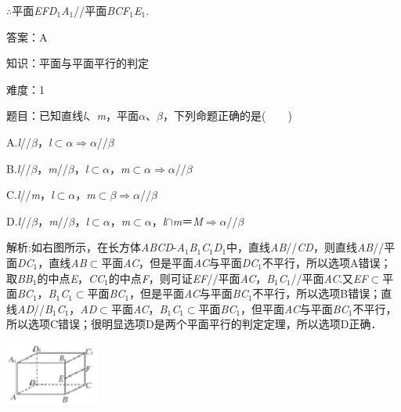 \documentclass{article} %
\begin{document}
$\mathrm{\therefore}$平面\textit{EFD}${}_{1}$\textit{A}${}_{1}$//平面\textit{BCF}${}_{1}$\textit{E}${}_{1}$.

答案：A

知识：平面与平面平行的判定

难度：1

题目：已知直线\textit{l}、\textit{m}，平面\textit{$\alpha$}、\textit{$\beta$}，下列命题正确的是(　　)

A.\textit{l}//\textit{$\beta$}，\textit{l}$\mathrm{\subset }$\textit{$\alpha$}$\mathrm{\Rightarrow }$\textit{$\alpha$}//\textit{$\beta$}

B.\textit{l}//\textit{$\beta$}，\textit{m}//\textit{$\beta$}，\textit{l}$\mathrm{\subset }$\textit{$\alpha$}，\textit{m}$\mathrm{\subset }$\textit{$\alpha$}$\mathrm{\Rightarrow }$\textit{$\alpha$}//\textit{$\beta$}

C.\textit{l}//\textit{m}，\textit{l}$\mathrm{\subset }$\textit{$\alpha$}，\textit{m}$\mathrm{\subset }$\textit{$\beta$}$\mathrm{\Rightarrow }$\textit{$\alpha$}//\textit{$\beta$}

D.\textit{l}//\textit{$\beta$}，\textit{m}//\textit{$\beta$}，\textit{l}$\mathrm{\subset }$\textit{$\alpha$}，\textit{m}$\mathrm{\subset }$\textit{$\alpha$}，\textit{l}$\mathrm{\cap}$\textit{m}＝\textit{M}$\mathrm{\Rightarrow }$\textit{$\alpha$}//\textit{$\beta$}

解析:如右图所示，在长方体\textit{ABCD}-\textit{A}${}_{1}$\textit{B}${}_{1}$\textit{C}${}_{1}$\textit{D}${}_{1}$中，直线\textit{AB}//\textit{CD}，则直线\textit{AB}//平面\textit{DC}${}_{1}$，直线\textit{AB}$\mathrm{\subset }$平面\textit{AC}，但是平面\textit{AC}与平面\textit{DC}${}_{1}$不平行，所以选项A错误；取\textit{BB}${}_{1}$的中点\textit{E}，\textit{CC}${}_{1}$的中点\textit{F}，则可证\textit{EF}//平面\textit{AC}，\textit{B}${}_{1}$\textit{C}${}_{1}$//平面\textit{AC}.又\textit{EF}$\mathrm{\subset }$平面\textit{BC}${}_{1}$，\textit{B}${}_{1}$\textit{C}${}_{1}$$\mathrm{\subset }$平面\textit{BC}${}_{1}$，但是平面\textit{AC}与平面\textit{BC}${}_{1}$不平行，所以选项B错误；直线\textit{AD}//\textit{B}${}_{1}$\textit{C}${}_{1}$，\textit{AD}$\mathrm{\subset }$平面\textit{AC}，\textit{B}${}_{1}$\textit{C}${}_{1}$$\mathrm{\subset }$平面\textit{BC}${}_{1}$，但平面\textit{AC}与平面\textit{BC}${}_{1}$不平行，所以选项C错误；很明显选项D是两个平面平行的判定定理，所以选项D正确．

\includegraphics*[width=1.22in, height=0.84in, keepaspectratio=false]{image148}
\end{document}
